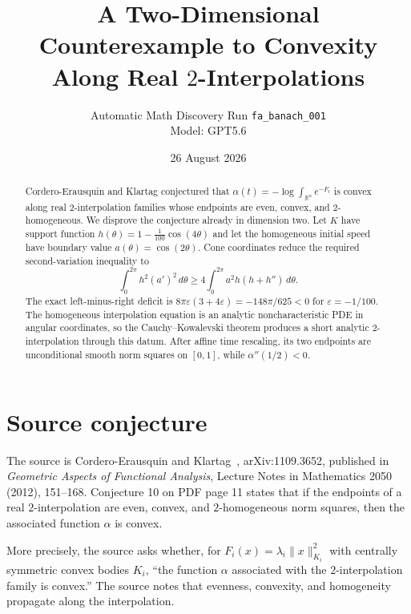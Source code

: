 \documentclass[11pt]{article}
\title{A Two-Dimensional Counterexample to Convexity\\
Along Real $2$-Interpolations}
\author{Automatic Math Discovery Run \texttt{fa\_banach\_001}\\Model: GPT5.6}
\date{26 August 2026}
\newcommand{\R}{\mathbb R}
\begin{document}
\maketitle

\begin{center}
\end{center}

\begin{abstract}
Cordero-Erausquin and Klartag conjectured that
$\alpha(t)=-\log\int_{\R^n}e^{-F_t}$ is convex along real
$2$-interpolation families whose endpoints are even, convex, and
$2$-homogeneous.  We disprove the conjecture already in dimension two.  Let
$K$ have support function
$h(\theta)=1-\frac1{100}\cos(4\theta)$ and let the homogeneous initial speed
have boundary value $a(\theta)=\cos(2\theta)$.  Cone coordinates reduce the
required second-variation inequality to
\[
 \int_0^{2\pi}h^2(a')^2\,d\theta
 \geq4\int_0^{2\pi}a^2h(h+h'')\,d\theta.
\]
The exact left-minus-right deficit is
$8\pi\varepsilon(3+4\varepsilon)=-148\pi/625<0$ for
$\varepsilon=-1/100$.  The homogeneous interpolation equation is an analytic
noncharacteristic PDE in angular coordinates, so the Cauchy--Kowalevski
theorem produces a short analytic $2$-interpolation through this datum.
After affine time rescaling, its two endpoints are unconditional smooth norm
squares on $[0,1]$, while $\alpha''(1/2)<0$.
\end{abstract}

\section{Source conjecture}

The source is Cordero-Erausquin and Klartag~\cite{CEK}, arXiv:1109.3652,
published in \emph{Geometric Aspects of Functional Analysis}, Lecture Notes
in Mathematics 2050 (2012), 151--168.  Conjecture 10 on PDF page 11 states
that if the endpoints of a real $2$-interpolation are even, convex, and
$2$-homogeneous norm squares, then the associated function $\alpha$ is
convex.

More precisely, the source asks whether, for
$F_i(x)=\lambda_i\|x\|_{K_i}^2$ with centrally symmetric convex bodies
$K_i$, ``the function $\alpha$ associated with the $2$-interpolation family
is convex.''  The source notes that evenness, convexity, and homogeneity
propagate along the interpolation.
\end{document}
